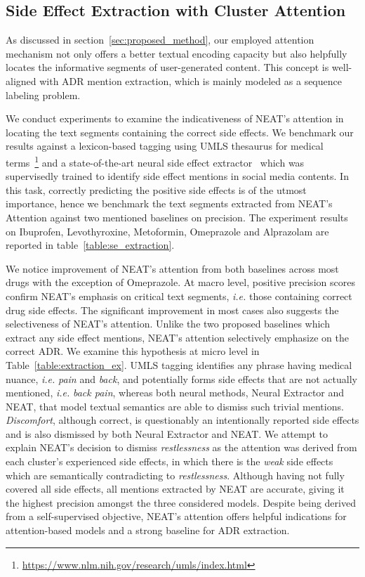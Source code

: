\documentclass{bmcart}
\begin{document}
\subsection{Side Effect Extraction with Cluster Attention}
As discussed in section~\ref{sec:proposed_method}, our employed attention mechanism not only offers a better textual encoding capacity but also helpfully locates the informative segments of user-generated content. This concept is well-aligned with ADR mention extraction, which is mainly modeled as a sequence labeling problem.

We conduct experiments to examine the indicativeness of NEAT's attention in locating the text segments containing the correct side effects. We benchmark our results against a lexicon-based tagging using UMLS thesaurus for medical terms~\footnote{\scriptsize{\url{https://www.nlm.nih.gov/research/umls/index.html}}} and a state-of-the-art neural side effect extractor~\cite{ding2018attentive} which was supervisedly trained to identify side effect mentions in social media contents. In this task, correctly predicting the positive side effects is of the utmost importance, hence we benchmark the text segments extracted from NEAT's Attention against two mentioned baselines on precision. The experiment results on Ibuprofen, Levothyroxine, Metoformin, Omeprazole and Alprazolam are reported in table~\ref{table:se_extraction}.

We notice improvement of NEAT's attention from both baselines across most drugs with the exception of Omeprazole. At macro level, positive precision scores confirm NEAT's emphasis on critical text segments, \textit{i.e.} those containing correct drug side effects. The significant improvement in most cases also suggests the selectiveness of NEAT's attention. Unlike the two proposed baselines which extract any side effect mentions, NEAT's attention selectively emphasize on the correct ADR. We examine this hypothesis at micro level in Table~\ref{table:extraction_ex}. UMLS tagging identifies any phrase having medical nuance, \textit{i.e.} \textit{pain} and \textit{back}, and potentially forms side effects that are not actually mentioned, \textit{i.e.} \textit{back pain}, whereas both neural methods, Neural Extractor and NEAT, that model textual semantics are able to dismiss such trivial mentions. \textit{Discomfort}, although correct, is questionably an intentionally reported side effects and is also dismissed by both Neural Extractor and NEAT. We attempt to explain NEAT's decision to dismiss \textit{restlessness} as the attention was derived from each cluster's experienced side effects, in which there is the \textit{weak} side effects which are semantically contradicting to \textit{restlessness}. Although having not fully covered all side effects, all mentions extracted by NEAT are accurate, giving it the highest precision amongst the three considered models. Despite being derived from a self-supervised objective, NEAT's attention offers helpful indications for attention-based models and a strong baseline for ADR extraction.
\end{document}
